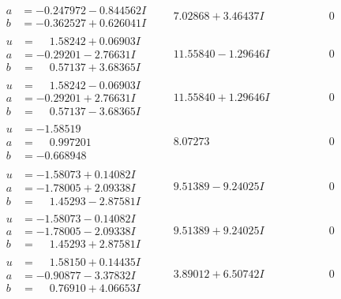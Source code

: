\documentclass[1p]{elsarticle_modified}
\theoremstyle{definition}
\begin{document}
$$\begin{array}{c|c|c}
\begin{aligned}
a &= -0.247972 - 0.844562 I \\
b &= -0.362527 + 0.626041 I\end{aligned}
 & \phantom{-}7.02868 + 3.46437 I & \phantom{-0.000000 } 0 \\ \hline\begin{aligned}
u &= \phantom{-}1.58242 + 0.06903 I \\
a &= -0.29201 - 2.76631 I \\
b &= \phantom{-}0.57137 + 3.68365 I\end{aligned}
 & \phantom{-}11.55840 - 1.29646 I & \phantom{-0.000000 } 0 \\ \hline\begin{aligned}
u &= \phantom{-}1.58242 - 0.06903 I \\
a &= -0.29201 + 2.76631 I \\
b &= \phantom{-}0.57137 - 3.68365 I\end{aligned}
 & \phantom{-}11.55840 + 1.29646 I & \phantom{-0.000000 } 0 \\ \hline\begin{aligned}
u &= -1.58519\phantom{ +0.000000I} \\
a &= \phantom{-}0.997201\phantom{ +0.000000I} \\
b &= -0.668948\phantom{ +0.000000I}\end{aligned}
 & \phantom{-}8.07273\phantom{ +0.000000I} & \phantom{-0.000000 } 0 \\ \hline\begin{aligned}
u &= -1.58073 + 0.14082 I \\
a &= -1.78005 + 2.09338 I \\
b &= \phantom{-}1.45293 - 2.87581 I\end{aligned}
 & \phantom{-}9.51389 - 9.24025 I & \phantom{-0.000000 } 0 \\ \hline\begin{aligned}
u &= -1.58073 - 0.14082 I \\
a &= -1.78005 - 2.09338 I \\
b &= \phantom{-}1.45293 + 2.87581 I\end{aligned}
 & \phantom{-}9.51389 + 9.24025 I & \phantom{-0.000000 } 0 \\ \hline\begin{aligned}
u &= \phantom{-}1.58150 + 0.14435 I \\
a &= -0.90877 - 3.37832 I \\
b &= \phantom{-}0.76910 + 4.06653 I\end{aligned}
 & \phantom{-}3.89012 + 6.50742 I & \phantom{-0.000000 } 0 \\ \hline\begin{aligned}

\end{aligned}
\end{array}$$
\end{document}
